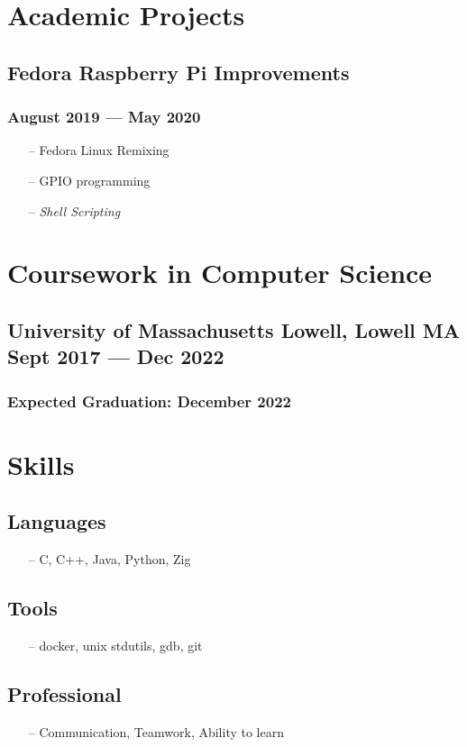 \documentclass[11pt]{article}
\begin{document}
\section{Academic Projects}

\subsection{Fedora Raspberry Pi Improvements}
\subsubsection{August 2019 --- May 2020 }
\begin{itemize}[noitemsep, topsep=0pt]
	\item[--] Fedora Linux Remixing
	\item[--] GPIO programming
	\item[--] \emph{Shell Scripting}
\end{itemize}

\section{Coursework in Computer Science}
\subsection{University of Massachusetts Lowell, Lowell MA\\  Sept 2017 --- Dec 2022}
\subsubsection{Expected Graduation: December 2022}
\noindent

\section{Skills}
\begin{multicols}{2}
	\subsection{Languages}
	\begin{itemize}[noitemsep, topsep=0pt]
		\item[--] C, C++, Java, Python, Zig
	\end{itemize}
	\subsection{Tools}
	\begin{itemize}[noitemsep, topsep=0pt]
		\item[--] docker, unix stdutils, gdb, git
	\end{itemize}
	\subsection{Professional}
	\begin{itemize}[noitemsep, topsep=0pt]
		\item[--] Communication, Teamwork, Ability to learn
	\end{itemize}
\end{multicols}
\end{document}
